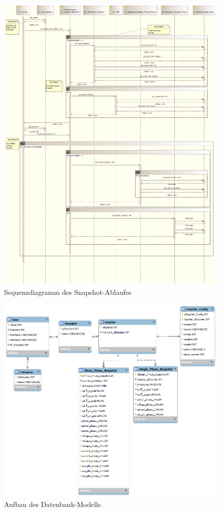 \documentclass[Bachelorarbeit.tex]{subfiles}
\begin{document}
\begin{figure}
\centering
\includegraphics[width=1\linewidth]{./img/Sequenzdiagramm_TakeSnapshot}
\caption{Sequenzdiagramm des Snapshot-Ablaufes}
\label{pic:sequenzdiagramm_takeSnapshot}
\end{figure}


\begin{figure}
\centering
\includegraphics[width=0.9\linewidth]{./img/db_modell}
\caption{Aufbau des Datenbank-Modells}
\label{pic:db_modell}
\end{figure}
\end{document}
